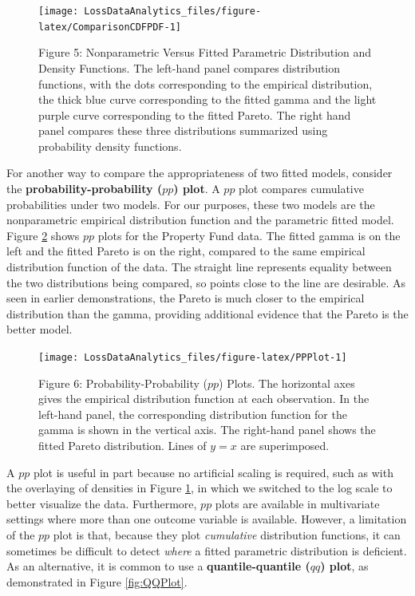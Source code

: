 \documentclass[]{book}
\theoremstyle{definition}
\theoremstyle{definition}
\theoremstyle{definition}
\theoremstyle{remark}
\begin{document}
\begin{figure}

{\centering \texttt{[image: LossDataAnalytics\_files/figure-latex/ComparisonCDFPDF-1]} 

}

\caption{Figure 5: Nonparametric Versus Fitted Parametric Distribution and Density Functions. The left-hand panel compares distribution functions, with the dots corresponding to the empirical distribution, the thick blue curve corresponding to the fitted gamma and the light purple curve corresponding to the fitted Pareto. The right hand panel compares these three distributions summarized using probability density functions.}\label{fig:ComparisonCDFPDF}
\end{figure}

For another way to compare the appropriateness of two fitted models,
consider the \textbf{probability-probability (\(pp\)) plot}. A \(pp\)
plot compares cumulative probabilities under two models. For our
purposes, these two models are the nonparametric empirical distribution
function and the parametric fitted model. Figure \ref{fig:PPPlot} shows
\(pp\) plots for the Property Fund data. The fitted gamma is on the left
and the fitted Pareto is on the right, compared to the same empirical
distribution function of the data. The straight line represents equality
between the two distributions being compared, so points close to the
line are desirable. As seen in earlier demonstrations, the Pareto is
much closer to the empirical distribution than the gamma, providing
additional evidence that the Pareto is the better model.

\begin{figure}

{\centering \texttt{[image: LossDataAnalytics\_files/figure-latex/PPPlot-1]} 

}

\caption{Figure 6: Probability-Probability ($pp$) Plots. The horizontal axes gives the empirical distribution function at each observation. In the left-hand panel, the corresponding distribution function for the gamma is shown in the vertical axis. The right-hand panel shows the fitted Pareto distribution. Lines of $y=x$ are superimposed.}\label{fig:PPPlot}
\end{figure}

A \(pp\) plot is useful in part because no artificial scaling is
required, such as with the overlaying of densities in Figure
\ref{fig:ComparisonCDFPDF}, in which we switched to the log scale to
better visualize the data. Furthermore, \(pp\) plots are available in
multivariate settings where more than one outcome variable is available.
However, a limitation of the \(pp\) plot is that, because they plot
\emph{cumulative} distribution functions, it can sometimes be difficult
to detect \emph{where} a fitted parametric distribution is deficient. As
an alternative, it is common to use a \textbf{quantile-quantile (\(qq\))
plot}, as demonstrated in Figure \ref{fig:QQPlot}.
\end{document}
